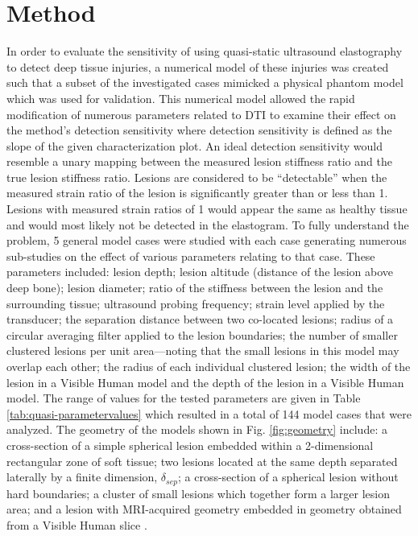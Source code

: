 	\section{Method}
		\label{sec:method}
		In order to evaluate the sensitivity of using quasi-static ultrasound elastography to detect deep tissue injuries, a numerical model of these injuries was created such that a subset of the investigated cases mimicked a physical phantom model which was used for validation. This numerical model allowed the rapid modification of numerous parameters related to DTI to examine their effect on the method's detection sensitivity where detection sensitivity is defined as the slope of the given characterization plot. An ideal detection sensitivity would resemble a unary mapping between the measured lesion stiffness ratio and the true lesion stiffness ratio. Lesions are considered to be ``detectable'' when the measured strain ratio of the lesion is significantly greater than or less than 1. Lesions with measured strain ratios of 1 would appear the same as healthy tissue and would most likely not be detected in the elastogram. To fully understand the problem, 5 general model cases were studied with each case generating numerous sub-studies on the effect of various parameters relating to that case. These parameters included: lesion depth; lesion altitude (distance of the lesion above deep bone); lesion diameter; ratio of the stiffness between the lesion and the surrounding tissue; ultrasound probing frequency; strain level applied by the transducer; the separation distance between two co-located lesions; radius of a circular averaging filter applied to the lesion boundaries; the number of smaller clustered lesions per unit area---noting that the small lesions in this model may overlap each other; the radius of each individual clustered lesion; the width of the lesion in a Visible Human \cite{visiblehuman} model and the depth of the lesion in a Visible Human model. The range of values for the tested parameters are given in Table \ref{tab:quasi-parametervalues} which resulted in a total of 144 model cases that were analyzed. The geometry of the models shown in Fig. \ref{fig:geometry} include: a cross-section of a simple spherical lesion embedded within a 2-dimensional rectangular zone of soft tissue; two lesions located at the same depth separated laterally by a finite dimension, $\delta_{sep}$; a cross-section of a spherical lesion without hard boundaries; a cluster of small lesions which together form a larger lesion area; and a lesion with MRI-acquired geometry \cite{solis13} embedded in geometry obtained from a Visible Human slice \cite{visiblehuman}.

